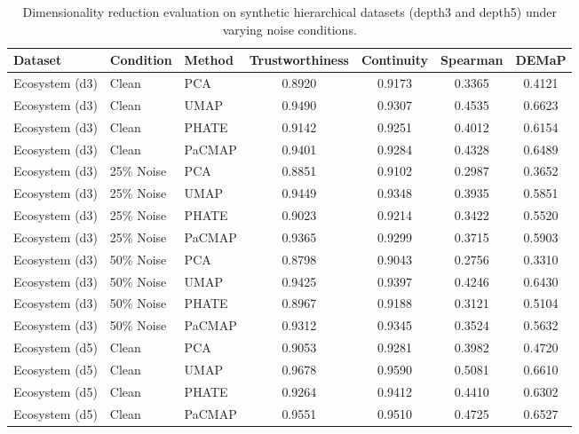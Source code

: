 \begin{table}[t]
    \centering
    \caption{Dimensionality reduction evaluation on synthetic hierarchical datasets (depth3 and depth5) under varying noise conditions.}
    \label{tab:dr_synthetic}
    \begin{tabular}{lllcccc}
    \toprule
    Dataset & Condition & Method & Trustworthiness & Continuity & Spearman & DEMaP \\
    \midrule
    
    Ecosystem (d3) & Clean & PCA & 0.8920 & 0.9173 & 0.3365 & 0.4121 \\
    Ecosystem (d3) & Clean & UMAP & 0.9490 & 0.9307 & 0.4535 & 0.6623 \\
    Ecosystem (d3) & Clean & PHATE & 0.9142 & 0.9251 & 0.4012 & 0.6154 \\
    Ecosystem (d3) & Clean & PaCMAP & 0.9401 & 0.9284 & 0.4328 & 0.6489 \\
    
    Ecosystem (d3) & 25\% Noise & PCA & 0.8851 & 0.9102 & 0.2987 & 0.3652 \\
    Ecosystem (d3) & 25\% Noise & UMAP & 0.9449 & 0.9348 & 0.3935 & 0.5851 \\
    Ecosystem (d3) & 25\% Noise & PHATE & 0.9023 & 0.9214 & 0.3422 & 0.5520 \\
    Ecosystem (d3) & 25\% Noise & PaCMAP & 0.9365 & 0.9299 & 0.3715 & 0.5903 \\
    
    Ecosystem (d3) & 50\% Noise & PCA & 0.8798 & 0.9043 & 0.2756 & 0.3310 \\
    Ecosystem (d3) & 50\% Noise & UMAP & 0.9425 & 0.9397 & 0.4246 & 0.6430 \\
    Ecosystem (d3) & 50\% Noise & PHATE & 0.8967 & 0.9188 & 0.3121 & 0.5104 \\
    Ecosystem (d3) & 50\% Noise & PaCMAP & 0.9312 & 0.9345 & 0.3524 & 0.5632 \\
    
    Ecosystem (d5) & Clean & PCA & 0.9053 & 0.9281 & 0.3982 & 0.4720 \\
    Ecosystem (d5) & Clean & UMAP & 0.9678 & 0.9590 & 0.5081 & 0.6610 \\
    Ecosystem (d5) & Clean & PHATE & 0.9264 & 0.9412 & 0.4410 & 0.6302 \\
    Ecosystem (d5) & Clean & PaCMAP & 0.9551 & 0.9510 & 0.4725 & 0.6527 \\
    

\end{tabular}
\end{table}

